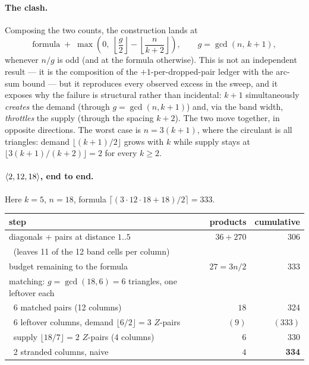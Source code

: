 \paragraph{The clash.} Composing the two counts, the construction lands at
\[
  \text{formula} \;+\; \max\!\left(0,\;
    \left\lfloor \frac{g}{2} \right\rfloor -
    \left\lfloor \frac{n}{k+2} \right\rfloor \right),
  \qquad g = \gcd(n,\,k{+}1),
\]
whenever \(n/g\) is odd (and at the formula otherwise). This is not an
independent result --- it is the composition of the \(+1\)-per-dropped-pair
ledger with the arc-sum bound --- but it reproduces every observed excess in
the sweep, and it exposes why the failure is structural rather than
incidental: \(k{+}1\) simultaneously \emph{creates} the demand (through
\(g = \gcd(n, k{+}1)\)) and, via the band width, \emph{throttles} the supply
(through the spacing \(k{+}2\)). The two move together, in opposite
directions. The worst case is \(n = 3(k{+}1)\), where the circulant is all
triangles: demand \(\lfloor (k{+}1)/2 \rfloor\) grows with \(k\) while supply
stays at \(\lfloor 3(k{+}1)/(k{+}2) \rfloor = 2\) for every \(k \ge 2\).

\paragraph{\(\langle 2, 12, 18 \rangle\), end to end.} Here \(k = 5\), \(n = 18\),
formula \(\lceil (3 \cdot 12 \cdot 18 + 18)/2 \rceil = 333\).

\begin{center}
\begin{tabular}{lrr}
\hline
step & products & cumulative \\
\hline
diagonals + pairs at distance \(1..5\) & \(36 + 270\) & 306 \\
\(\;\;\)(leaves 11 of the 12 band cells per column) & & \\
\hline
budget remaining to the formula & \(27 = 3n/2\) & 333 \\
\hline
matching: \(g = \gcd(18,6) = 6\) triangles, one leftover each & & \\
\(\;\;\)6 matched pairs (12 columns) & \(18\) & 324 \\
\(\;\;\)6 leftover columns, demand \(\lfloor 6/2 \rfloor = 3\) \(Z\)-pairs
  & \((9)\) & \((333)\) \\
\(\;\;\)supply \(\lfloor 18/7 \rfloor = 2\) \(Z\)-pairs (4 columns)
  & \(6\) & 330 \\
\(\;\;\)2 stranded columns, naive & \(4\) & \textbf{334} \\
\hline
\end{tabular}
\end{center}

